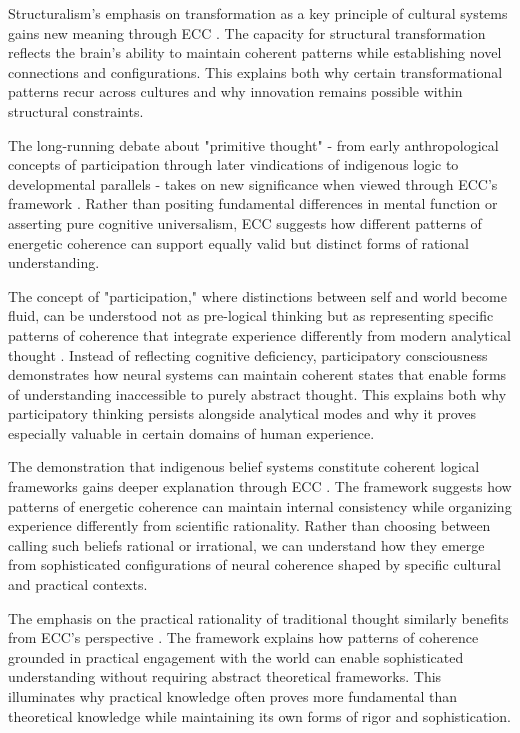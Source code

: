 \begin{refsection}
Structuralism's emphasis on transformation as a key principle of cultural systems gains new meaning through ECC \cite{turner1982ritual}. The capacity for structural transformation reflects the brain's ability to maintain coherent patterns while establishing novel connections and configurations. This explains both why certain transformational patterns recur across cultures and why innovation remains possible within structural constraints.

The long-running debate about "primitive thought" - from early anthropological concepts of participation through later vindications of indigenous logic to developmental parallels - takes on new significance when viewed through ECC's framework \cite{levi1985how}. Rather than positing fundamental differences in mental function or asserting pure cognitive universalism, ECC suggests how different patterns of energetic coherence can support equally valid but distinct forms of rational understanding.

The concept of "participation," where distinctions between self and world become fluid, can be understood not as pre-logical thinking but as representing specific patterns of coherence that integrate experience differently from modern analytical thought \cite{levi1985how}. Instead of reflecting cognitive deficiency, participatory consciousness demonstrates how neural systems can maintain coherent states that enable forms of understanding inaccessible to purely abstract thought. This explains both why participatory thinking persists alongside analytical modes and why it proves especially valuable in certain domains of human experience.

The demonstration that indigenous belief systems constitute coherent logical frameworks gains deeper explanation through ECC \cite{evans1937witchcraft}. The framework suggests how patterns of energetic coherence can maintain internal consistency while organizing experience differently from scientific rationality. Rather than choosing between calling such beliefs rational or irrational, we can understand how they emerge from sophisticated configurations of neural coherence shaped by specific cultural and practical contexts.

The emphasis on the practical rationality of traditional thought similarly benefits from ECC's perspective \cite{godelier1986mental}. The framework explains how patterns of coherence grounded in practical engagement with the world can enable sophisticated understanding without requiring abstract theoretical frameworks. This illuminates why practical knowledge often proves more fundamental than theoretical knowledge while maintaining its own forms of rigor and sophistication.


\end{refsection}
